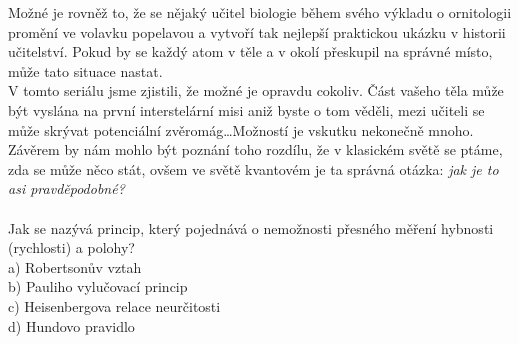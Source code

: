\documentclass[crop=false]{standalone}
\begin{document}

Možné je rovněž to, že se nějaký učitel biologie během svého výkladu o ornitologii promění ve volavku popelavou a vytvoří tak 
nejlepší praktickou ukázku v historii učitelství. Pokud by se každý atom v těle a v okolí přeskupil na správné místo, může tato situace nastat.
\\

V tomto seriálu jsme zjistili, že možné je opravdu cokoliv. Část vašeho těla může být vyslána na první interstelární misi aniž 
byste o tom věděli, mezi učiteli se může skrývat potenciální zvěromág\dots Možností je vskutku nekonečně mnoho. Závěrem by nám 
mohlo být poznání toho rozdílu, že v klasickém světě se ptáme, zda se může něco stát, ovšem ve světě kvantovém je ta správná 
otázka: \textit{jak je to asi pravděpodobné?}
\\
\\
Jak se nazývá princip, který pojednává o nemožnosti přesného měření hybnosti (rychlosti) a polohy?
\\

a) Robertsonův vztah
\\

b) Pauliho vylučovací princip
\\

c) Heisenbergova relace neurčitosti
\\

d) Hundovo pravidlo
\end{document}
